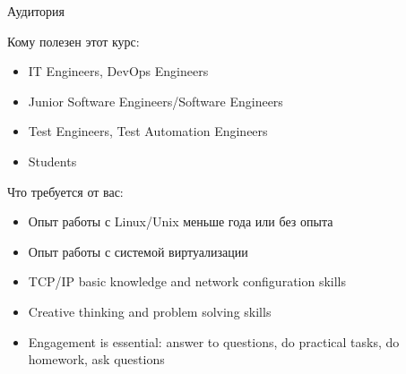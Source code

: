 \begin{frame}{Аудитория}

Кому полезен этот курс:
\begin{itemize}
    \item IT Engineers, DevOps Engineers
    \item Junior Software Engineers/Software Engineers
    \item Test Engineers, Test Automation Engineers
    \item Students
\end{itemize}
    \pause
Что требуется от вас:
\begin{itemize}
    \item Опыт работы с Linux/Unix меньше года или без опыта
    \pause
    \item Опыт работы с системой виртуализации
    \item TCP/IP basic knowledge and network configuration skills
    \item Creative thinking and problem solving skills
    \pause
    \item \alert{Engagement is essential: answer to questions, do practical tasks, do homework, ask questions}
\end{itemize}
\end{frame}
